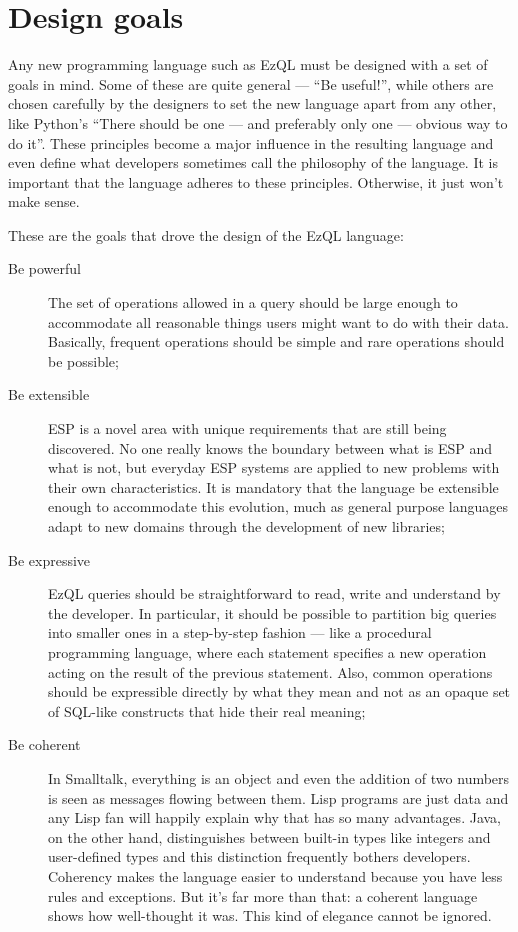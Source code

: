 \documentclass{report}
\begin{document}
\section{Design goals}
\label{sec:design-goals}

Any new programming language such as EzQL must be designed with a set
of goals in mind. Some of these are quite general --- ``Be useful!'',
while others are chosen carefully by the designers to set the new
language apart from any other, like Python's ``There should be one ---
and preferably only one --- obvious way to do it''. These principles
become a major influence in the resulting language and even define
what developers sometimes call the philosophy of the language. It is
important that the language adheres to these principles. Otherwise, it
just won't make sense.

These are the goals that drove the design of the EzQL language:

\begin{description}
\item[Be powerful] The set of operations allowed in a query should be
  large enough to accommodate all reasonable things users might want
  to do with their data. Basically, frequent operations should be
  simple and rare operations should be possible;
\item[Be extensible] ESP is a novel area with unique requirements that
  are still being discovered. No one really knows the boundary between
  what is ESP and what is not, but everyday ESP systems are applied to
  new problems with their own characteristics. It is mandatory that
  the language be extensible enough to accommodate this evolution,
  much as general purpose languages adapt to new domains through the
  development of new libraries;
\item[Be expressive] EzQL queries should be straightforward to read,
  write and understand by the developer. In particular, it should be
  possible to partition big queries into smaller ones in a
  step-by-step fashion --- like a procedural programming language,
  where each statement specifies a new operation acting on the result
  of the previous statement. Also, common operations should be
  expressible directly by what they mean and not as an opaque set of
  SQL-like constructs that hide their real meaning;
\item[Be coherent] In Smalltalk, everything is an object and even the
  addition of two numbers is seen as messages flowing between
  them. Lisp programs are just data and any Lisp fan will happily
  explain why that has so many advantages. Java, on the other hand,
  distinguishes between built-in types like integers and user-defined
  types and this distinction frequently bothers developers. Coherency
  makes the language easier to understand because you have less rules
  and exceptions. But it's far more than that: a coherent language
  shows how well-thought it was. This kind of elegance cannot be
  ignored.
\end{description}
\end{document}
